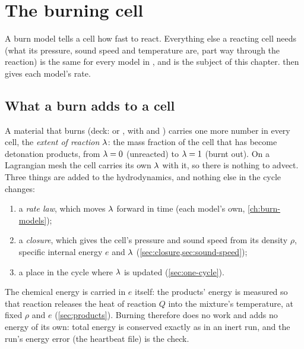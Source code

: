 \chapter{The burning cell}
\label{ch:burning-cell}


A burn model tells a cell how fast to react. Everything else a reacting
cell needs (what its pressure, sound speed and temperature are, part way
through the reaction) is the same for every model in \bw, and is the
subject of this chapter.  then gives each model's rate.

\section{What a burn adds to a cell}
\label{sec:burn-adds}

A material that burns (deck:  or ,
with  and ) carries one
more number in every cell, the \emph{extent of reaction} $\lambda$: the mass
fraction of the cell that has become detonation products, from $\lambda = 0$
(unreacted) to $\lambda = 1$ (burnt out). On a Lagrangian mesh the cell
carries its own $\lambda$ with it, so there is nothing to advect. Three things
are added to the hydrodynamics, and nothing else in the cycle changes:
\begin{enumerate}
\item a \emph{rate law}, which moves $\lambda$ forward in time (each model's
  own, \cref{ch:burn-models});
\item a \emph{closure}, which gives the cell's pressure and sound speed from
  its density $\rho$, specific internal energy $e$ and $\lambda$
  (\cref{sec:closure,sec:sound-speed});
\item a place in the cycle where $\lambda$ is updated (\cref{sec:one-cycle}).
\end{enumerate}

The chemical energy is carried in $e$ itself: the products' energy is
measured so that reaction releases the heat of reaction $Q$ into the
mixture's temperature, at fixed $\rho$ and $e$ (\cref{sec:products}).
Burning therefore does no work and adds no energy of its own: total energy
is conserved exactly as in an inert run, and the run's energy error (the
heartbeat file) is the check.

